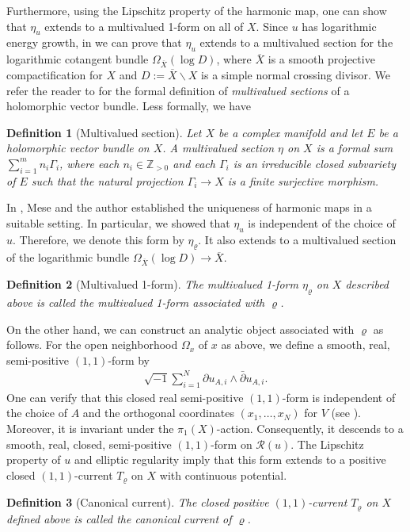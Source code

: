 \documentclass[10pt,a4paper]{amsart}
\newtheorem{dfn}{Definition}
\begin{document}
%
Furthermore, using the Lipschitz property of the harmonic map, one can show that $\eta_u$ extends to a multivalued 1-form on all of $X$. Since $u$ has logarithmic energy growth, in \cite{BDDM} we can prove that  $\eta_u$ extends to a multivalued section for the logarithmic cotangent bundle $\Omega_{\overline{X}}(\log D)$, where $\overline{X}$ is a smooth projective compactification for $X$ and $D:=\overline{X}\backslash X$ is a simple normal crossing divisor.     We refer the reader to \cite[\S 3.1]{CDY22} for the formal definition of \emph{multivalued sections} of a holomorphic vector bundle. Less formally, we have
\begin{dfn}[Multivalued  section]\label{def:multivalued}
	Let $X$ be a complex manifold and let $E$ be a  holomorphic  vector bundle on $X$.  A \emph{multivalued section} $\eta$ on $X$ is   a formal sum $ \sum_{i=1}^{m}n_i\Gamma_i$, where each $n_i\in \mathbb{Z}_{>0}$ and each $\Gamma_i$  is an irreducible closed subvariety of $E$ such that  
	the natural projection $\Gamma_i\to X$ is a finite surjective morphism.  
\end{dfn}
In \cite{DM24},  Mese and the author established the uniqueness of harmonic maps in a suitable setting. In particular, we showed that $\eta_u$ is independent of the choice of $u$. Therefore, we denote this form by $\eta_\varrho$.   It also extends to a multivalued section of the logarithmic bundle $\Omega_{\overline{X}}(\log D)\to \overline{X}$. 
\begin{dfn}[Multivalued 1-form]\label{def:multivaluedform}
	The multivalued 1-form $\eta_\varrho$ on $X$ described above is called the \emph{multivalued 1-form associated with $\varrho$}.
\end{dfn}
On the other hand, we can construct an analytic object associated with $\varrho$ as follows.   For the open neighborhood  $\Omega_x$ of $x$ as above, we define  a smooth, real, semi-positive $(1,1)$-form by
\begin{align}\label{eq:form}
	\sqrt{-1}\sum_{i=1}^{N}\partial u_{A,i} \wedge \bar{\partial} u_{A,i}.
\end{align}
One can verify that this closed real semi-positive $(1,1)$-form is independent of the choice of $A$ and the orthogonal coordinates $(x_1,\ldots,x_N)$ for $V$ (see \cite[\S 3]{DW24b}). Moreover, it is invariant under the $\pi_1(X)$-action. Consequently, it descends to a smooth, real, closed, semi-positive $(1,1)$-form on $\mathcal{R}(u)$. 
The Lipschitz property of $u$ and elliptic regularity imply  that this form extends to a positive closed $(1,1)$-current $T_{\varrho}$ on $X$ with continuous potential. 
\begin{dfn}[Canonical current]\label{def:canonical}
	The closed positive $(1,1)$-current $T_\varrho$ on $X$ defined above is called the \emph{canonical current} of $\varrho$.
\end{dfn}
\end{document}

